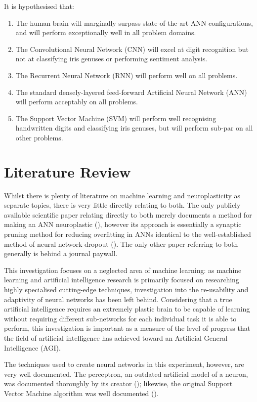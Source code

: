 \documentclass[]{report}
\begin{document}
It is hypothesised that:
\begin{enumerate}
	\item The human brain will marginally surpass state-of-the-art ANN configurations, and will perform exceptionally well in all problem domains.
	\item The Convolutional Neural Network (CNN) will excel at digit recognition but not at classifying iris genuses or performing sentiment analysis.
	\item The Recurrent Neural Network (RNN) will perform well on all problems.
	\item The standard densely-layered feed-forward Artificial Neural Network (ANN) will perform acceptably on all problems.
	\item The Support Vector Machine (SVM) will perform well recognising handwritten digits and classifying iris genuses, but will perform sub-par on all other problems.
\end{enumerate}

\section{Literature Review}

Whilst there is plenty of literature on machine learning and neuroplasticity as separate topics, there is very little directly relating to both. The only publicly available scientific paper relating directly to both merely documents a method for making an ANN neuroplastic (\cite{perwej12}), however its approach is essentially a synaptic pruning method for reducing overfitting in ANNs identical to the well-established method of neural network dropout (\cite{dropout14}). The only other paper referring to both generally is behind a journal paywall.

This investigation focuses on a neglected area of machine learning: as machine learning and artificial intelligence research is primarily focused on researching highly specialised cutting-edge techniques, investigation into the re-usability and adaptivity of neural networks has been left behind. Considering that a true artificial intelligence requires an extremely plastic brain to be capable of learning without requiring different sub-networks for each individual task it is able to perform, this investigation is important as a measure of the level of progress that the field of artificial intelligence has achieved toward an Artificial General Intelligence (AGI).

The techniques used to create neural networks in this experiment, however, are very well documented. The perceptron, an outdated artificial model of a neuron, was documented thoroughly by its creator (\cite{rosenblatt1958perceptron}); likewise, the original Support Vector Machine algorithm was well documented (\cite{vapnik1995support}).
\end{document}
